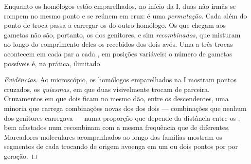 \begin{proposition}[A permutação]\label{prop:g12:meiosis-genetic-shuffling:crossingover}
Enquanto os homólogos estão emparelhados, no início da  I, duas
 não irmãs se rompem no mesmo ponto e se reúnem em cruz: é
uma \emph{permutação}. Cada  além do ponto
de troca passa a carregar os  do outro homólogo. Os 
que chegam aos gametas não são, portanto, os  dos genitores,
e sim  \emph{recombinados}, que misturam ao longo do
comprimento deles os  recebidos dos dois avós. Uma a três trocas
acontecem em cada par a cada , em posições variáveis: o número de
gametas possíveis é, na prática, ilimitado.
\end{proposition}
\begin{proof}[Evidências]
Ao microscópio, os homólogos emparelhados na  I mostram pontos
cruzados, os \emph{quiasmas}, em que duas  visivelmente
trocam de parceira. Cruzamentos em que dois  ficam no mesmo
 dão, entre os descendentes, uma minoria que carrega
combinações novas dos  dos dois  --- combinações que nenhum
dos genitores carregava --- numa proporção que depende da distância
entre os ;  bem afastados num  recombinam com a
mesma frequência que  de  diferentes. Marcadores
moleculares acompanhados ao longo das famílias mostram os segmentos de
cada  trocando de origem avoenga em um ou dois pontos por
 por geração.
\end{proof}

